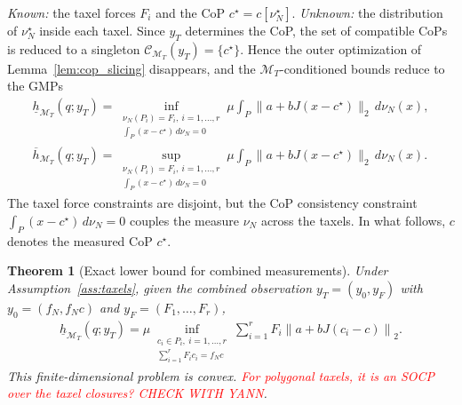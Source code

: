 \documentclass[11pt,a4paper]{article}
\theoremstyle{plain}
\newtheorem{theorem}{Theorem}[section]
\begin{document}
\textit{Known:} the taxel forces $F_i$ and the CoP $c^\star=c[\nu_N^\star]$. \textit{Unknown:} the distribution of $\nu_N^\star$ inside each taxel.
Since $y_T$ determines the CoP, the set of compatible CoPs is reduced to a singleton $\mathcal C_{\mathcal M_T}(y_T)=\{c^\star\}$. Hence the outer optimization of
Lemma~\ref{lem:cop_slicing} disappears, and the $\mathcal M_T$-conditioned bounds reduce to the GMPs
\begin{align}
    \underline h_{\mathcal M_T}(q;y_T)
    =
    \inf_{\substack{
    \nu_N(P_i)=F_i,\ i=1,\ldots,r\\
    \int_P(x-c^\star)\,d\nu_N=0}}
    \mu\int_P
    \|a+bJ(x-c^\star)\|_2\,d\nu_N(x),
    \\
    \overline h_{\mathcal M_T}(q;y_T)
    =
    \sup_{\substack{
    \nu_N(P_i)=F_i,\ i=1,\ldots,r\\
    \int_P(x-c^\star)\,d\nu_N=0}}
    \mu\int_P
    \|a+bJ(x-c^\star)\|_2\,d\nu_N(x).
\end{align}
The taxel force constraints are disjoint, but the CoP consistency constraint $\int_P(x-c^\star)\,d\nu_N=0$ couples the measure $\nu_N$ across the taxels.
In what follows, $c$ denotes the measured CoP $c^\star$.

\begin{theorem}[Exact lower bound for combined measurements]
\label{thm:combined_lower}
    Under Assumption~\ref{ass:taxels}, given the combined observation $y_T=(y_0,y_F)$ with $y_0=(f_N,f_Nc)$ and $y_F=(F_1,\ldots,F_r)$,
    \begin{align}
        \label{eq:combined_lower_reduction}
        \boxed{\underline h_{\mathcal M_T}(q;y_T)
        =
        \mu
        \inf_{\substack{
            c_i\in P_i,\ i=1,\ldots,r\\
            \sum_{i=1}^rF_ic_i=f_Nc
        }}
        \sum_{i=1}^r
        F_i\left\|a+bJ(c_i-c)\right\|_2.}
    \end{align}
    This finite-dimensional problem is convex. \textcolor{red}{For polygonal taxels, it is an SOCP over the taxel closures? CHECK WITH YANN}.
\end{theorem}
\end{document}

